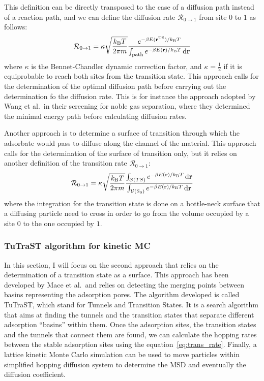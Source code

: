 \documentclass[main]{subfiles}
\begin{document}
This definition can be directly transposed to the case of a diffusion path instead of a reaction path, and we can define the diffusion rate $\mathcal{R}_{0\rightarrow 1}$ from site $0$ to $1$ as follows:
\begin{equation}\label{eq:trans_rate_path}
  \mathcal{R}_{0\rightarrow 1} = \kappa\sqrt{\frac{k_{\text{B}}T}{2\pi m}}\frac{e^{-\beta E(\mathbf{r}^{\text{TS}})/k_{\text{B}}T}}{\int_{\text{path}}e^{-\beta E(\mathbf{r})/k_{\text{B}}T}\mathop{}\mathopen{}\mathrm{d}\mathbf{r}}
\end{equation}
where $\kappa$ is the Bennet-Chandler dynamic correction factor,\autocite{BENNETT1977} and  $\kappa=\tfrac{1}{2}$ if it is equiprobable to reach both sites from the transition state. This approach calls for the determination of the optimal diffusion path before carrying out the determination fo the diffusion rate. This is for instance the approach adopted by Wang et al.\ in their screening for noble gas separation, where they determined the minimal energy path before calculating diffusion rates.\autocite{Wang_2022}

Another approach is to determine a surface of transition through which the adsorbate would pass to diffuse along the channel of the material. This approach calls for the determination of the surface of transition only, but it relies on another definition of the transition rate $\mathcal{R}_{0\rightarrow 1}$:
\begin{equation}\label{eq:trans_rate}
  \mathcal{R}_{0\rightarrow 1} = \kappa\sqrt{\frac{k_{\text{B}}T}{2\pi m}}\frac{\int_{\mathcal{S}(TS)}e^{-\beta E(\mathbf{r})/k_{\text{B}}T}\mathop{}\mathopen{}\mathrm{d}\mathbf{r}}{\int_{\mathcal{V}(\text{S}_0)}e^{-\beta E(\mathbf{r})/k_{\text{B}}T}\mathop{}\mathopen{}\mathrm{d}\mathbf{r}}
\end{equation}
where the integration for the transition state is done on a bottle-neck surface that a diffusing particle need to cross in order to go from the volume occupied by a site $0$ to the one occupied by $1$.

\subsubsection{TuTraST algorithm for kinetic MC}\label{sct:tutrast}

In this section, I will focus on the second approach that relies on the determination of a transition state as a surface. This approach has been developed by Mace et al.\autocite{Mace_2019}\ and relies on detecting the merging points between basins representing the adsorption pores. The algorithm developed is called TuTraST, which stand for Tunnels and Transition States. It is a search algorithm that aims at finding the tunnels and the transition states that separate different adsorption ``basins'' within them. Once the adsorption sites, the transition states and the tunnels that connect them are found, we can calculate the hopping rates between the stable adsorption sites using the equation~\ref{eq:trans_rate}. Finally, a lattice kinetic Monte Carlo simulation can be used to move particles within simplified hopping diffusion system to determine the MSD and eventually the diffusion coefficient. 
\end{document}
